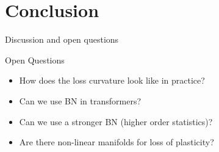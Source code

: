 \documentclass{beamer}
\begin{document}
\section{Conclusion}

\begin{frame}{Discussion and open questions}
    
    \begin{alertblock}{Open Questions}
        \begin{itemize}
            \item How does the loss curvature look like in practice?
            \item Can we use BN in transformers?
            \item Can we use a stronger BN (higher order statistics)?
            \item Are there non-linear manifolds for loss of plasticity? 
        \end{itemize}
    \end{alertblock}
\end{frame}
\end{document}

